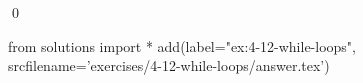 
\begin{ex}
  \label{ex:4-12-while-loops}
  
  \qed
\end{ex}
\begin{python0}
from solutions import *
add(label="ex:4-12-while-loops",
    srcfilename='exercises/4-12-while-loops/answer.tex')
\end{python0}
